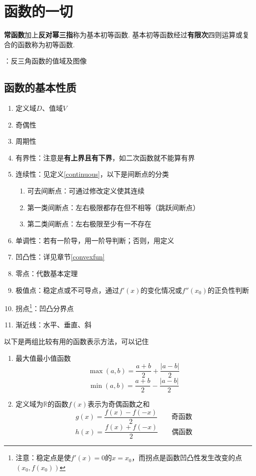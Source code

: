 
\section{函数的一切}
\begin{definition}[(基本)初等函数]
\textbf{常函数}加上\textbf{反对幂三指}称为基本初等函数. 基本初等函数经过\textbf{有限次}四则运算或复合的函数称为初等函数. 
\end{definition}
：反三角函数的值域及图像
\subsection{函数的基本性质}
\begin{enumerate}
	\itemsep -3pt
	\item 定义域$D$、值域$V$
	\item 奇偶性
	\item 周期性
	\item 有界性：注意是\textbf{有上界且有下界}，如二次函数就不能算有界
	\item 连续性：见定义\ref{continuous}，以下是间断点的分类
	\begin{enumerate}
		\itemsep -3pt
		\item 可去间断点：可通过修改定义使其连续
		\item 第一类间断点：左右极限都存在但不相等（跳跃间断点）
		\item 第二类间断点：左右极限至少有一不存在
	\end{enumerate}
	\item 单调性：若有一阶导，用一阶导判断；否则，用定义
	\item 凹凸性：详见章节\ref{convexfun}
	\item 零点：代数基本定理
	\item 极值点：稳定点或不可导点，通过$f'(x)$的变化情况或$f''(x_0)$的正负性判断
	\item 拐点\footnote{注意：稳定点是使$f'(x)=0$的$x=x_0$，而拐点是函数凹凸性发生改变的点$(x_0,f(x_0))$}：凹凸分界点
	\item 渐近线：水平、垂直、斜
\end{enumerate}
以下是两组比较有用的函数表示方法，可以记住
\begin{enumerate}
	\item 最大值最小值函数
		\[\max(a,b)=\frac{a+b}{2}+\frac{|a-b|}{2}\]
		\[\min(a,b)=\frac{a+b}{2}-\frac{|a-b|}{2}\]
	\item 定义域为$\mathbb{R}$的函数$f(x)$表示为奇偶函数之和
		\[g(x)=\frac{f(x)-f(-x)}{2}\qquad\mbox{奇函数}\]
		\[h(x)=\frac{f(x)+f(-x)}{2}\qquad\mbox{偶函数}\]
\end{enumerate}

